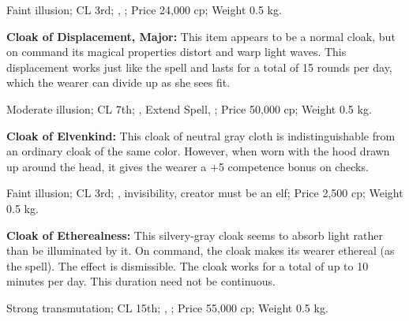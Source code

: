 Faint illusion; CL 3rd; , ; Price 24,000 cp; Weight 0.5 kg.


\textbf{Cloak of Displacement, Major:} This item appears to be a normal cloak, but on command its magical properties distort and warp light waves. This displacement works just like the  spell and lasts for a total of 15 rounds per day, which the wearer can divide up as she sees fit.

Moderate illusion; CL 7th; , Extend Spell, ; Price 50,000 cp; Weight 0.5 kg.


\textbf{Cloak of Elvenkind:} This cloak of neutral gray cloth is indistinguishable from an ordinary cloak of the same color. However, when worn with the hood drawn up around the head, it gives the wearer a +5 competence bonus on  checks.

Faint illusion; CL 3rd; , invisibility, creator must be an elf; Price 2,500 cp; Weight 0.5 kg.


\textbf{Cloak of Etherealness:} This silvery-gray cloak seems to absorb light rather than be illuminated by it. On command, the cloak makes its wearer ethereal (as the  spell). The effect is dismissible. The cloak works for a total of up to 10 minutes per day. This duration need not be continuous.

Strong transmutation; CL 15th; , ; Price 55,000 cp; Weight 0.5 kg.






